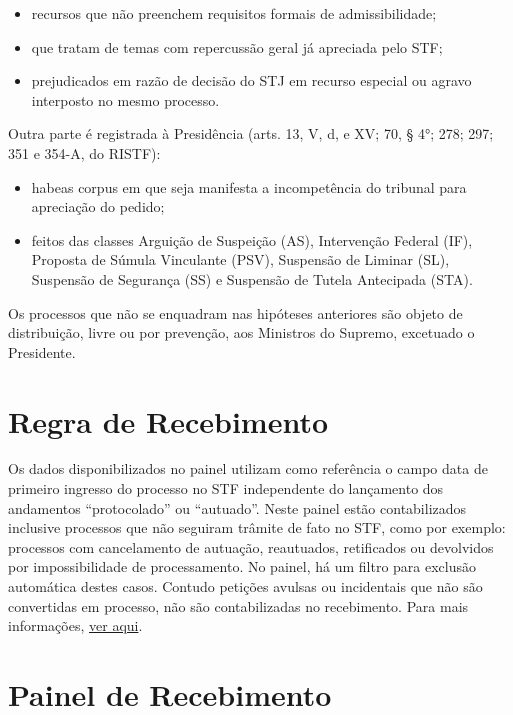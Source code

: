 \documentclass[
]{book}
\providecommand{\tightlist}{%
  \setlength{\itemsep}{0pt}\setlength{\parskip}{0pt}}
\begin{document}
\begin{itemize}
\item
  recursos que não preenchem requisitos formais de admissibilidade;
\item
  que tratam de temas com repercussão geral já apreciada pelo STF;
\item
  prejudicados em razão de decisão do STJ em recurso especial ou agravo interposto no mesmo processo.
\end{itemize}

Outra parte é registrada à Presidência (arts. 13, V, d, e XV; 70, § 4°; 278; 297; 351 e 354-A, do RISTF):

\begin{itemize}
\tightlist
\item
  habeas corpus em que seja manifesta a incompetência do tribunal para apreciação do pedido;
\item
  feitos das classes Arguição de Suspeição (AS), Intervenção Federal (IF), Proposta de Súmula Vinculante (PSV), Suspensão de Liminar (SL), Suspensão de Segurança (SS) e Suspensão de Tutela Antecipada (STA).
\end{itemize}

Os processos que não se enquadram nas hipóteses anteriores são objeto de distribuição, livre ou por prevenção, aos Ministros do Supremo, excetuado o Presidente.

\hypertarget{regra-de-recebimento}{%
\section{Regra de Recebimento}\label{regra-de-recebimento}}

Os dados disponibilizados no painel utilizam como referência o campo data de primeiro ingresso do processo no STF independente do lançamento dos andamentos ``protocolado'' ou ``autuado''.
Neste painel estão contabilizados inclusive processos que não seguiram trâmite de fato no STF, como por exemplo: processos com cancelamento de autuação, reautuados, retificados ou devolvidos por impossibilidade de processamento. No painel, há um filtro para exclusão automática destes casos.
Contudo petições avulsas ou incidentais que não são convertidas em processo, não são contabilizadas no recebimento. Para mais informações, \protect\hyperlink{painel-recebimento}{ver aqui}.

\hypertarget{painel-recebimento}{%
\section{Painel de Recebimento}\label{painel-recebimento}}
\end{document}
